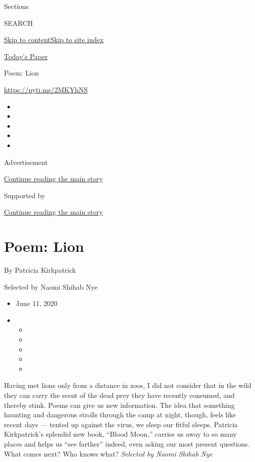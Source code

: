 Sections

SEARCH

\protect\hyperlink{site-content}{Skip to
content}\protect\hyperlink{site-index}{Skip to site index}

\href{https://myaccount.nytimes3xbfgragh.onion/auth/login?response_type=cookie\&client_id=vi}{}

\href{https://www.nytimes3xbfgragh.onion/section/todayspaper}{Today's
Paper}

Poem: Lion

\url{https://nyti.ms/2MKYhNS}

\begin{itemize}
\item
\item
\item
\item
\item
\end{itemize}

Advertisement

\protect\hyperlink{after-top}{Continue reading the main story}

Supported by

\protect\hyperlink{after-sponsor}{Continue reading the main story}

\hypertarget{poem-lion}{%
\section{Poem: Lion}\label{poem-lion}}

By Patricia Kirkpatrick

Selected by Naomi Shihab Nye

\begin{itemize}
\item
  June 11, 2020
\item
  \begin{itemize}
  \item
  \item
  \item
  \item
  \item
  \end{itemize}
\end{itemize}

Having met lions only from a distance in zoos, I did not consider that
in the wild they can carry the scent of the dead prey they have recently
consumed, and thereby stink. Poems can give us new information. The idea
that something haunting and dangerous strolls through the camp at night,
though, feels like recent days --- tented up against the virus, we sleep
our fitful sleeps. Patricia Kirkpatrick's splendid new book, ``Blood
Moon,'' carries us away to so many places and helps us ``see farther''
indeed, even asking our most present questions. What comes next? Who
knows what? \emph{Selected by Naomi Shihab Nye}

